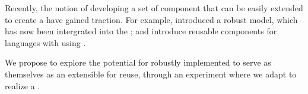 Recently, the notion of developing a set of component that can be easily extended to create a \tvm{} have gained traction. For example,  introduced a robust \objectstorage{} model, which has now been intergrated into the \Truffle{} \framework{}; and  introduce reusable components for languages with \denotationalSemantics{} using \emph{\ObjectAlgebras{}} .

We propose to explore the potential for robustly implemented \tvms{} to serve as themselves as an extensible \frameworks{} for reuse, through an experiment where we adapt \textsc{\SOMns{}} to realize a \GraceVM{}.


%









% 
